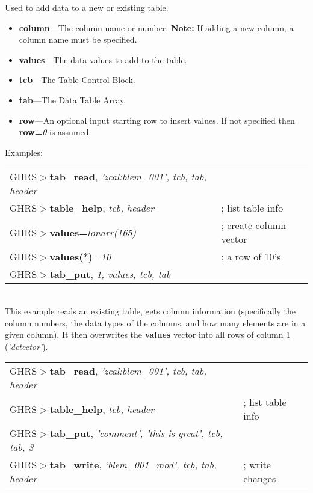 \begin{description}
Used to add data to a new or existing table. 

\begin{itemize}

\item {\bf column}---The column name or number. {\bf Note:} If adding a new 
column, a column name must be specified.

\item {\bf values}---The data values to add to the table.

\item {\bf tcb}---The Table Control Block.

\item {\bf tab}---The Data Table Array.

\item {\bf row}---An optional input starting row to insert values.   If not 
specified then {\bf row=}{\it 0} is assumed.

\end{itemize}

\noindent
Examples:\\

\begin{tabular}{ll}
GHRS$>${\bf tab\_read}, {\it 'zcal:blem\_001', tcb, tab, header} & \\
GHRS$>${\bf table\_help}, {\it tcb, header} & ; list table info\\
GHRS$>${\bf values=}{\it lonarr(165)} & ; create column vector\\
GHRS$>${\bf values(}{\it $*$}{\bf )=}{\it 10} & ; a row of 10's\\
GHRS$>${\bf tab\_put}, {\it 1, values, tcb, tab} & \\
\end{tabular}\\

\noindent
This example reads an existing table, gets column information (specifically the
column numbers, the data types of the columns, and how many elements are in 
a given column).  It then overwrites the {\bf values} vector into all rows of
column 1 ({\it 'detector'}).\\

\begin{tabular}{ll}
GHRS$>${\bf tab\_read}, {\it 'zcal:blem\_001', tcb, tab, header} & \\
GHRS$>${\bf table\_help}, {\it tcb, header} & ; list table info\\
GHRS$>${\bf tab\_put}, {\it 'comment', 'this is great', tcb, tab, 3} & \\
GHRS$>${\bf tab\_write}, {\it 'blem\_001\_mod', tcb, tab, header} & ; write changes\\
\end{tabular}\\


\end{description}
